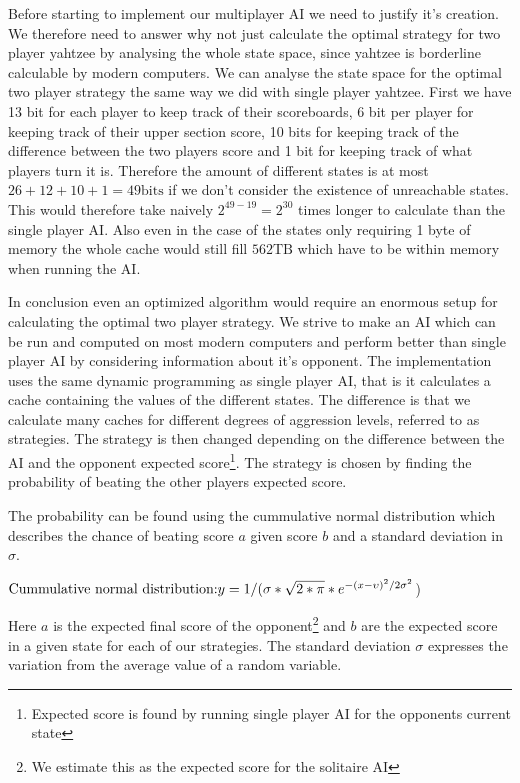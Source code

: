 Before starting to implement our multiplayer AI we need to justify it's creation. We therefore need to answer why not just calculate the optimal strategy for two player yahtzee by analysing the whole state space, since yahtzee is borderline calculable by modern computers. We can analyse the state space for the optimal two player strategy the same way we did with single player yahtzee. First we have 13 bit for each player to keep track of their scoreboards, 6 bit per player for keeping track of their upper section score, 10 bits for keeping track of the difference between the two players score and 1 bit for keeping track of what players turn it is. Therefore the amount of different states is at most $26+12+10+1 = 49\mbox{bits}$ if we don't consider the existence of unreachable states. This would therefore take naively $2^{49-19} = 2^{30}$ times longer to calculate than the single player AI. Also even in the case of the states only requiring 1 byte of memory the whole cache would still fill $562 \mbox{TB}$ which have to be within memory when running the AI. 

In conclusion even an optimized algorithm would require an enormous setup for calculating the optimal two player strategy. We strive to make an AI which can be run and computed on most modern computers and perform better than single player AI by considering information about it's opponent. The implementation uses the same dynamic programming as single player AI, that is it calculates a cache containing the values of the different states. The difference is that we calculate many caches for different degrees of aggression levels, referred to as strategies. The strategy is then changed depending on the difference between the AI and the opponent expected score\footnote{Expected score is found by running single player AI for the opponents current state}. The strategy is chosen by finding the probability of beating the other players expected score. 

The probability can be found using the cummulative normal distribution which describes the chance of beating score $a$ given score $b$ and a standard deviation in  $\sigma$. %

$\newline\mbox{Cummulative normal distribution:} \newline y = 1  /(\sigma * \sqrt{2 * \pi} * e^{-(x - \upsilon)^2 / 2 \sigma^2}$)\newline

Here $a$ is the expected final score of the opponent\footnote{We estimate this as the expected score for the solitaire AI} and $b$ are the expected score in a given state for each of our strategies. The standard deviation $\sigma$ expresses the variation from the average value of a random variable.  

